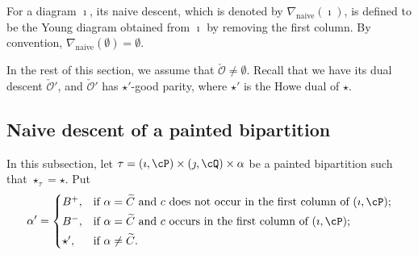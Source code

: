 \documentclass[12pt,a4paper]{amsart}
\newcommand{\CO}{{\mathcal {O}}}
\def\eDD{\overline{\nabla}}
\numberwithin{equation}{section}
\theoremstyle{remark}
\begin{document}
For a diagram $\imath$, its naive descent, which is denoted by $\nabla_\mathrm{naive}(\imath)$, is defined to be the Young diagram obtained from $\imath$ by removing the first column. By convention, $\nabla_\mathrm{naive}(\emptyset)=\emptyset$.

In the rest of this section, we assume that $\check \CO\neq \emptyset$. Recall that we have its dual descent $\check \CO'$, and $\check \CO'$ has $\star'$-good parity, where $\star'$ is the Howe dual of $\star$.

 \subsection{Naive descent of a painted bipartition }
\def\bipartl{\mathrm{bi\cP_L}}
\def\bipartr{\mathrm{bi\cP_R}}
\def\dsdiagl{\mathrm{DS_L}}
\def\dsdiagr{\mathrm{DS_R}}
\def\DDl{\eDD_\mathrm{L}}
\def\DDr{\eDD_\mathrm{R}}


In this subsection, let $\tau=(\imath,\cP)\times (\jmath,\cQ)\times \alpha$ be a  painted bipartition such that $\star_\tau=\star$. Put
  \begin{equation} \label{eq:def.alphap}
    \alpha'=\begin{cases} B^+,
  & \textrm{if $\alpha=\widetilde{C}$ and $c$ does not occur in the first column of $(\imath,\cP)$}; \smallskip \\
  B^-,
  & \textrm{if $\alpha=\widetilde{C}$ and  $c$ occurs in the first column of $(\imath,\cP)$}; \smallskip \\
  \star', & \textrm{if $\alpha\neq \widetilde C$}.
  \end{cases}
  \end{equation}
\end{document}
